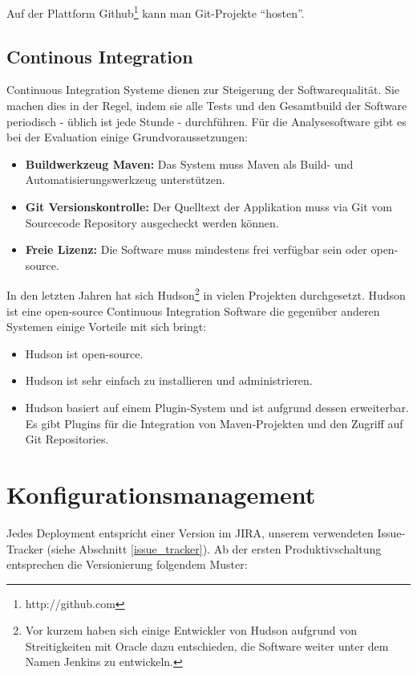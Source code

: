 Auf der Plattform Github\footnote{http://github.com} kann man Git-Projekte ``hosten''.  




\subsection{Continous Integration}
Continuous Integration Systeme dienen zur Steigerung der Softwarequalität. Sie machen dies in der Regel, indem sie alle Tests und den Gesamtbuild der Software periodisch - üblich ist jede Stunde - durchführen. Für die Analysesoftware gibt es bei der Evaluation einige Grundvoraussetzungen:
\begin{itemize}
	\item \textbf{Buildwerkzeug Maven:} Das System muss Maven als Build- und Automatisierungswerkzeug unterstützen.
	\item \textbf{Git Versionskontrolle:} Der Quelltext der Applikation muss via Git vom Sourcecode Repository ausgecheckt werden können.
	\item \textbf{Freie Lizenz:} Die Software muss mindestens frei verfügbar sein oder open-source.
\end{itemize}
In den letzten Jahren hat sich Hudson\footnote{Vor kurzem haben sich einige Entwickler von Hudson aufgrund von Streitigkeiten mit Oracle dazu entschieden, die Software weiter unter dem Namen Jenkins zu entwickeln.} in vielen Projekten durchgesetzt. Hudson ist eine open-source Continuous Integration Software die gegenüber anderen Systemen einige Vorteile mit sich bringt:
\begin{itemize}
\item Hudson ist open-source.
\item Hudson ist sehr einfach zu installieren und administrieren.
\item Hudson basiert auf einem Plugin-System und ist aufgrund dessen erweiterbar. Es gibt Plugins für die Integration von Maven-Projekten und den Zugriff auf Git Repositories.
\end{itemize}

\section{Konfigurationsmanagement}
Jedes Deployment entspricht einer Version im JIRA, unserem verwendeten Issue-Tracker (siehe Abschnitt \ref{issue_tracker}).
Ab der ersten Produktivschaltung entsprechen die Versionierung folgendem Muster:
\begin{center}
\end{center}


